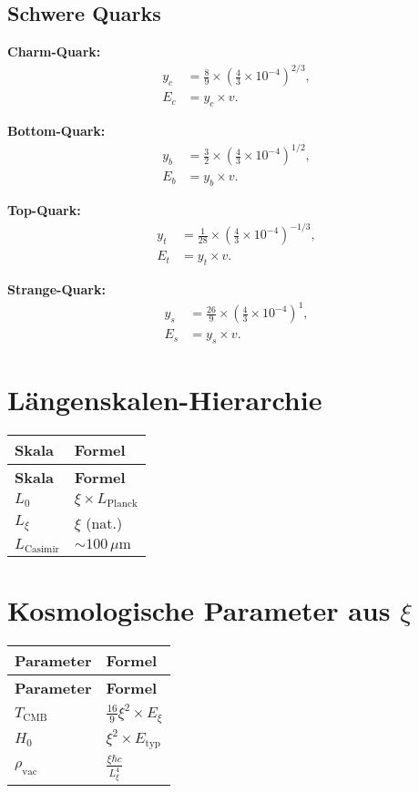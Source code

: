 \documentclass[12pt,a4paper]{article}
\begin{document}
	\subsection{Schwere Quarks}
	
	\textbf{Charm-Quark:}
	\begin{align}
		y_c &= \frac{8}{9} \times \left(\frac{4}{3} \times 10^{-4}\right)^{2/3}, \\
		E_c &= y_c \times v.
	\end{align}
	
	\textbf{Bottom-Quark:}
	\begin{align}
		y_b &= \frac{3}{2} \times \left(\frac{4}{3} \times 10^{-4}\right)^{1/2}, \\
		E_b &= y_b \times v.
	\end{align}
	
	\textbf{Top-Quark:}
	\begin{align}
		y_t &= \frac{1}{28} \times \left(\frac{4}{3} \times 10^{-4}\right)^{-1/3}, \\
		E_t &= y_t \times v.
	\end{align}
	
	\textbf{Strange-Quark:}
	\begin{align}
		y_s &= \frac{26}{9} \times \left(\frac{4}{3} \times 10^{-4}\right)^{1}, \\
		E_s &= y_s \times v.
	\end{align}
	
	\section{Längenskalen-Hierarchie}
	\begin{longtable}{|p{5cm}|p{6cm}|}
		\hline
		\textbf{Skala} & \textbf{Formel} \\
		\hline
		\endfirsthead
		\hline
		\textbf{Skala} & \textbf{Formel} \\
		\hline
		\endhead
		$L_0$ & $\xi \times L_{\text{Planck}}$ \\
		\hline
		$L_{\xi}$ & $\xi$ (nat.) \\
		\hline
		$L_{\text{Casimir}}$ & $\sim 100 \, \mu\text{m}$ \\
		\hline
	\end{longtable}
	
	\section{Kosmologische Parameter aus $\xi$}
	\begin{longtable}{|p{5cm}|p{6cm}|}
		\hline
		\textbf{Parameter} & \textbf{Formel} \\
		\hline
		\endfirsthead
		\hline
		\textbf{Parameter} & \textbf{Formel} \\
		\hline
		\endhead
		$T_{\text{CMB}}$ & $\frac{16}{9}\xi^{2} \times E_{\xi}$ \\
		\hline
		$H_0$ & $\xi^{2} \times E_{\text{typ}}$ \\
		\hline
		$\rho_{\text{vac}}$ & $\frac{\xi\hbar c}{L_{\xi}^{4}}$ \\
		\hline
	\end{longtable}
	
\end{document}
